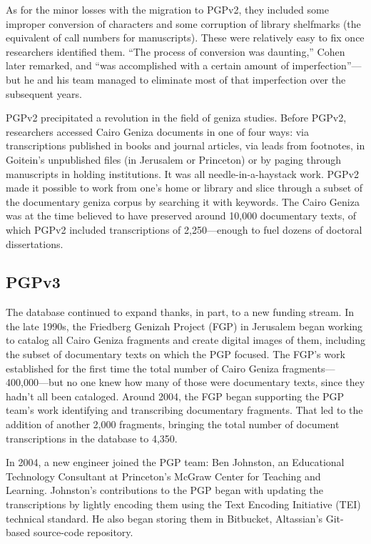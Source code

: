 \documentclass{article}
\begin{document}
As for the minor losses with the migration to PGPv2, they included some improper conversion of characters and some corruption of library shelfmarks (the equivalent of call numbers for manuscripts). These were relatively easy to fix once researchers identified them. “The process of conversion was daunting,” Cohen later remarked, and “was accomplished with a certain amount of imperfection”—but he and his team managed to eliminate most of that imperfection over the subsequent years\autocite[43]{cohen_princeton_2014}.

PGPv2 precipitated a revolution in the field of geniza studies. Before PGPv2, researchers accessed Cairo Geniza documents in one of four ways: via transcriptions published in books and journal articles, via leads from footnotes, in Goitein’s unpublished files (in Jerusalem or Princeton) or by paging through manuscripts in holding institutions. It was all needle-in-a-haystack work. PGPv2 made it possible to work from one’s home or library and slice through a subset of the documentary geniza corpus by searching it with keywords. The Cairo Geniza was at the time believed to have preserved around 10,000 documentary texts, of which PGPv2 included transcriptions of 2,250—enough to fuel dozens of doctoral dissertations. 

\subsection{PGPv3}

The database continued to expand thanks, in part, to a new funding stream. In the late 1990s, the Friedberg Genizah Project (FGP) in Jerusalem began working to catalog all Cairo Geniza fragments and create digital images of them, including the subset of documentary texts on which the PGP focused. The FGP’s work established for the first time the total number of Cairo Geniza fragments—400,000—but no one knew how many of those were documentary texts, since they hadn’t all been cataloged. Around 2004, the FGP began supporting the PGP team’s work identifying and transcribing documentary fragments. That led to the addition of another 2,000 fragments, bringing the total number of document transcriptions in the database to 4,350.

In 2004, a new engineer joined the PGP team: Ben Johnston, an Educational Technology Consultant at Princeton’s McGraw Center for Teaching and Learning. Johnston’s contributions to the PGP began with updating the transcriptions by lightly encoding them using the Text Encoding Initiative (TEI) technical standard. He also began storing them in Bitbucket, Altassian’s Git-based source-code repository. 
\end{document}
